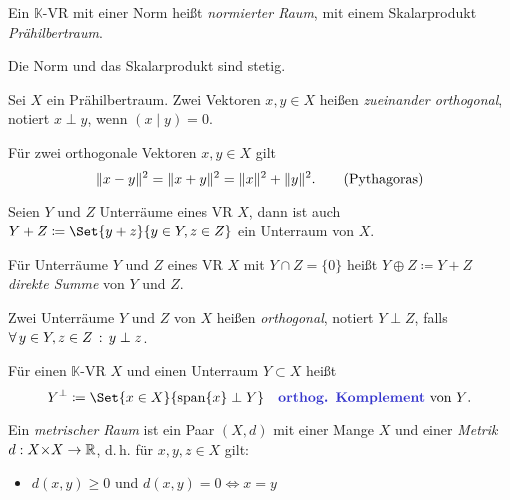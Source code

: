 \documentclass{cheat-sheet}
\newcommand{\K}{\mathbb{K}}
\newcommand{\scp}[2]{\left( #1 \!\mid\! #2 \right)} %
\begin{document}
\begin{defn}
  Ein $\K$-VR mit einer Norm heißt \emph{normierter Raum}, mit einem Skalarprodukt \emph{Prähilbertraum}.
\end{defn}

\begin{satz}
  Die Norm und das Skalarprodukt sind stetig.
\end{satz}

\begin{defn}
  Sei $X$ ein Prähilbertraum. Zwei Vektoren $x, y \in X$ heißen \emph{zueinander orthogonal}, notiert $x \perp y$, wenn $\scp{x}{y} = 0$.
\end{defn}

\begin{satz}
  Für zwei orthogonale Vektoren $x, y \in X$ gilt
  \[ \lVert x - y\rVert^2 = \lVert x + y\rVert^2 = \lVert x\rVert^2 + \lVert y\rVert^2. \tag*{(Pythagoras)} \]
\end{satz}

\begin{lem}
  Seien $Y$ und $Z$ Unterräume eines VR $X$, dann ist auch $Y + Z \coloneqq \Set{ y + z }{ y \in Y, z \in Z }$ ein Unterraum von $X$.
\end{lem}

\begin{defn}
  Für Unterräume $Y$ und $Z$ eines VR $X$ mit $Y \cap Z = \{ 0 \}$ heißt $Y \oplus Z \coloneqq Y + Z$ \emph{direkte Summe} von $Y$ und $Z$.
\end{defn}

\begin{defn}
  Zwei Unterräume $Y$ und $Z$ von $X$ heißen \emph{orthogonal}, notiert $Y \perp Z$, falls $\forall \, {y \in Y, z \in Z} \,:\, y \perp z$.
\end{defn}

\begin{defn}
  Für einen $\K$-VR $X$ und einen Unterraum $Y \subset X$ heißt
  \[ Y^\perp \coloneqq \Set{ x \in X }{ \mathrm{span} \{ x \} \perp Y } \quad \text{\emph{orthog. Komplement} von $Y$}. \]
\end{defn}


\begin{defn}
  Ein \emph{metrischer Raum} ist ein Paar $(X, d)$ mit einer Mange $X$ und einer \emph{Metrik} $d : X {\times} X \to \mathbb{R}$, d.\,h. für $x, y, z \in X$ gilt:
  \begin{itemize}
    \item $d(x, y) \geq 0$ \enspace und \enspace $d(x, y) = 0 \iff x = y$ 
  \end{itemize}
\end{defn}
\end{document}
